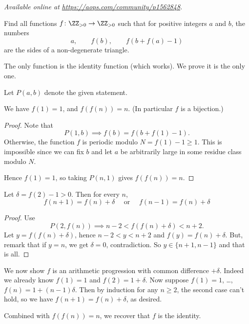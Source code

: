 \textsl{Available online at \url{https://aops.com/community/p1562848}.}
\begin{mdframed}[style=mdpurplebox,frametitle={Problem statement}]
Find all functions $f \colon \ZZ_{>0} \to \ZZ_{>0}$
such that for positive integers $a$ and $b$, the numbers
\[ a, \qquad f(b), \qquad f(b+f(a)-1) \]
are the sides of a non-degenerate triangle.
\end{mdframed}
The only function is the identity function (which works).
We prove it is the only one.

Let $P(a,b)$ denote the given statement.

\begin{claim*}
  We have $f(1) = 1$, and $f(f(n)) = n$.
  (In particular $f$ is a bijection.)
\end{claim*}
\begin{proof}
  Note that \[ P(1,b) \implies f(b) = f(b+f(1)-1). \]
  Otherwise, the function $f$ is periodic modulo $N = f(1)-1 \ge 1$.
  This is impossible since we can fix $b$ and let $a$ be arbitrarily
  large in some residue class modulo $N$.

  Hence $f(1)=1$, so taking $P(n,1)$ gives $f(f(n)) = n$.
\end{proof}

\begin{claim*}
  Let $\delta = f(2)-1 > 0$.
  Then for every $n$,
  \[ f(n+1) = f(n) + \delta
    \quad\text{ or }\quad f(n-1) = f(n) + \delta \]
\end{claim*}
\begin{proof}
  Use
  \[ P(2, f(n)) \implies n-2 < f( f(n) + \delta ) < n+2. \]
  Let $y = f(f(n)+\delta)$, hence $n-2 < y < n+2$
  and $f(y) = f(n)+\delta$.
  But, remark that if $y = n$, we get $\delta = 0$, contradiction.
  So $y \in \{n+1, n-1\}$ and that is all.
\end{proof}

We now show $f$ is an arithmetic progression
with common difference $+\delta$.
Indeed we already know $f(1) = 1$ and $f(2) = 1+\delta$.
Now suppose $f(1)=1$, \dots, $f(n) = 1 + (n-1)\delta$.
Then by induction for any $n \ge 2$,
the second case can't hold,
so we have $f(n+1) = f(n)+\delta$, as desired.

Combined with $f(f(n)) = n$, we recover that $f$ is the identity.
\pagebreak